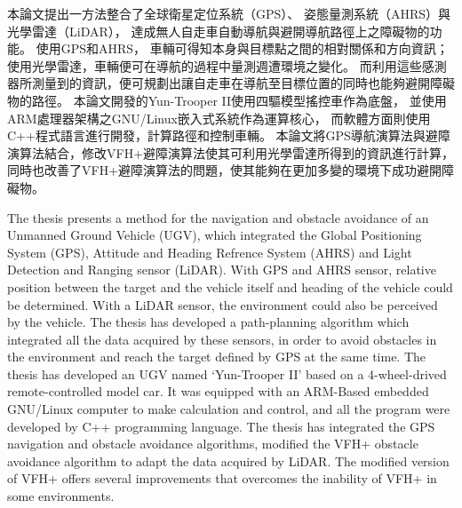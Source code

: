 \begin{abstractzh}
本論文提出一方法整合了全球衛星定位系統（GPS）、
姿態量測系統（AHRS）與光學雷達（LiDAR），
達成無人自走車自動導航與避開導航路徑上之障礙物的功能。
使用GPS和AHRS，
車輛可得知本身與目標點之間的相對關係和方向資訊；
使用光學雷達，車輛便可在導航的過程中量測週遭環境之變化。
而利用這些感測器所測量到的資訊，便可規劃出讓自走車在導航至目標位置的同時也能夠避開障礙物的路徑。
本論文開發的Yun-Trooper II使用四驅模型搖控車作為底盤，
並使用ARM處理器架構之GNU/Linux嵌入式系統作為運算核心，
而軟體方面則使用C++程式語言進行開發，計算路徑和控制車輛。
本論文將GPS導航演算法與避障演算法結合，修改VFH+避障演算法使其可利用光學雷達所得到的資訊進行計算，
同時也改善了VFH+避障演算法的問題，使其能夠在更加多變的環境下成功避開障礙物。


\end{abstractzh}

\begin{abstracten}
The thesis presents a method for the navigation and obstacle avoidance 
of an Unmanned Ground Vehicle (UGV), which integrated the
Global Positioning System (GPS), 
Attitude and Heading Refrence System (AHRS) and
Light Detection and Ranging sensor (LiDAR).
With GPS and AHRS sensor, relative position between the target and the vehicle itself and heading of the vehicle could be determined.
With a LiDAR sensor, the environment could also be perceived by the vehicle. 
The thesis has developed a path-planning algorithm which integrated all the data acquired by these sensors, 
in order to avoid obstacles in the environment and reach the target defined by GPS at the same time.
The thesis has developed an UGV named `Yun-Trooper \nolinebreak II' based on a 4-wheel-drived remote-controlled model car.
It was equipped with an ARM-Based embedded GNU/Linux computer to make calculation and control,
and all the program were developed by C++ programming language.
The thesis has integrated the GPS navigation and obstacle avoidance algorithms,
modified the VFH+ obstacle avoidance algorithm to adapt the data acquired by LiDAR.
The modified version of VFH+ offers several improvements that overcomes the inability of VFH+ in some environments.


\end{abstracten}
